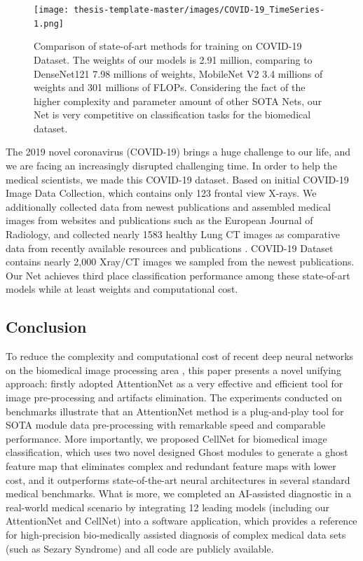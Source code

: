 \begin{figure}[h]
\centering
\texttt{[image: thesis-template-master/images/COVID-19\_TimeSeries-1.png]}
\label{fig}
\centering
\caption{ Comparison of state-of-art methods for training on COVID-19 Dataset.  The weights of our models is 2.91 million, comparing to DenseNet121 7.98 millions of weights, MobileNet V2 3.4 millions of weights and 301 millions of FLOPs. Considering the fact of the higher complexity and parameter amount of other SOTA Nets, our Net is very competitive on classification tasks for the biomedical dataset. }
\end{figure}

The 2019 novel coronavirus (COVID-19) brings a huge challenge to our life, and we are facing an increasingly disrupted challenging time. In order to help the medical scientists, we made this COVID-19 dataset. Based on initial COVID-19 Image Data Collection\cite{37}, which contains only 123 frontal view X-rays. We additionally collected data from newest publications and assembled medical images from websites and publications such as the European Journal of Radiology\cite{36}, and collected nearly 1583 healthy Lung CT images as comparative data from recently available resources and publications\cite{37} \cite{38}. COVID-19 Dataset contains nearly 2,000 Xray/CT images we sampled from the newest publications. Our Net achieves third place classification performance among these state-of-art models while at least weights and computational cost.




\subsection*{Conclusion}
To reduce the complexity and computational cost of recent deep neural networks on the biomedical image processing area \cite{3}\cite{15}\cite{17}, this paper presents a novel unifying approach: firstly adopted AttentionNet as a very effective and efficient tool for image pre-processing and artifacts elimination. The experiments conducted on benchmarks illustrate that an AttentionNet method is a plug-and-play tool for SOTA module data pre-processing with remarkable speed and comparable performance. More importantly, we proposed CellNet for biomedical image classification, which uses two novel designed Ghost modules to generate a ghost feature map that eliminates complex and redundant feature maps with lower cost, and it outperforms state-of-the-art neural architectures in several standard medical benchmarks.
What is more, we completed an AI-assisted diagnostic in a real-world medical scenario by integrating 12 leading models (including our AttentionNet and CellNet) into a software application, which provides a reference for high-precision bio-medically assisted diagnosis of complex medical data sets (such as Sezary Syndrome) and all code are publicly available.







